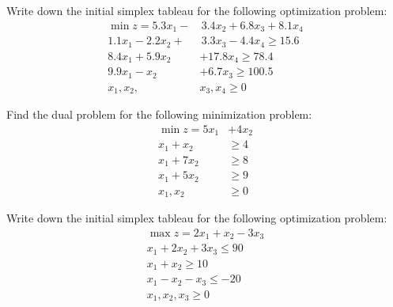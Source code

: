 \documentclass[11pt,letterpaper]{article}
\begin{document}

 Write down the initial simplex tableau for the following optimization problem:
	\[
	\begin{aligned}
	\min z= 5.3x_1 - &\,3.4x_2 + 6.8x_3 + 8.1x_4 \\
	1.1x_1 - 2.2x_2 + &\,3.3x_3 - 4.4x_4 \geq 15.6 \\
	8.4x_1 + 5.9x_2 &+ 17.8x_4 \geq 78.4 \\
	9.9x_1 - x_2 &+ 6.7 x_3 \geq 100.5 \\
	x_1, x_2, \,&x_3, x_4 \geq 0 
	\end{aligned}
	\]



\newpage



 Find the dual problem for the following minimization problem:
	\[
	\begin{aligned}
	\min z= 5x_1 &+ 4x_2 \\
	x_1 + x_2 &\geq 4 \\
	x_1 + 7x_2 &\geq 8 \\
	x_1 + 5x_2 &\geq 9 \\
	x_1, x_2 &\geq 0 
	\end{aligned}
	\]



\newpage



 Write down the initial simplex tableau for the following optimization problem:
	\[
	\begin{aligned}
	\max z= 2x_1 + x_2 - 3x_3 \\
	x_1 + 2x_2 + 3x_3 \leq 90 \\
	x_1 + x_2 \geq 10 \\
	x_1 - x_2 - x_3 \leq -20 \\
	x_1, x_2, x_3 \geq 0 
	\end{aligned}
	\]
\end{document}

